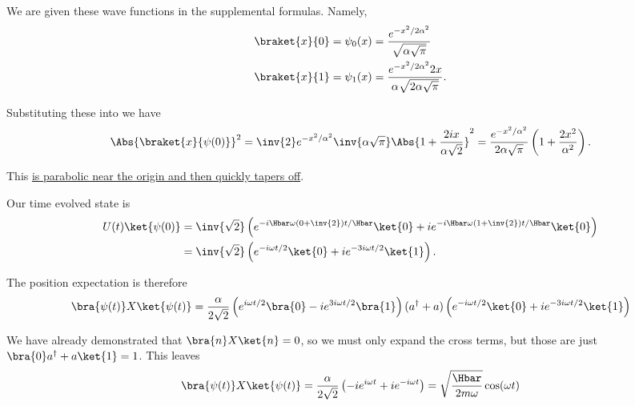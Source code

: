 {We are given these wave functions in the supplemental formulas.  Namely,
%
\begin{equation}\label{eqn:qmIexamPractice2008Dec:3:220}
\begin{aligned}
\braket{x}{0} &= \psi_0(x) = \frac{e^{-x^2/2\alpha^2}}{ \sqrt{\alpha \sqrt{\pi}}} \\
\braket{x}{1} &= \psi_1(x) = \frac{e^{-x^2/2\alpha^2} 2 x }{ \alpha \sqrt{2 \alpha \sqrt{\pi}}}.
\end{aligned}
\end{equation}

Substituting these into  we have
%
\begin{equation}\label{eqn:qmIexamPractice2008Dec:3:230}
\Abs{ \braket{x}{\psi(0)} }^2
=
\inv{2}
e^{-x^2/\alpha^2}
\inv{
\alpha \sqrt{\pi}}
\Abs{ 1 + \frac{2 i x}{\alpha \sqrt{2} } }^2
=
\frac{e^{-x^2/\alpha^2}}{ 2
\alpha \sqrt{\pi}}
\left( 1 + \frac{2 x^2}{\alpha^2 } \right).
\end{equation}

This \href{http://www.wolframalpha.com/input/?i=graph+e^(-x^2)+(1+\%2B+2x^2)}{is parabolic near the origin and then quickly tapers off}.

Our time evolved state is
\begin{equation}\label{eqn:qmIexamPractice2008Dec:3:300}
\begin{aligned}
U(t) \ket{\psi(0)} 
&= \inv{\sqrt{2}}
\left(
e^{-i \Hbar \omega \left( 0 + \inv{2} \right) t/\Hbar } \ket{0}
+ i e^{-i \Hbar \omega \left( 1 + \inv{2} \right) t/\Hbar } \ket{0}
\right) \\
&=
\inv{\sqrt{2}}
\left(
e^{-i \omega t/2 } \ket{0}
+ i e^{- 3 i \omega t/2 } \ket{1}
\right).
\end{aligned}
\end{equation}

The position expectation is therefore
\begin{equation}\label{eqn:qmIexamPractice:750}
\begin{aligned}
\bra{\psi(t)} X \ket{\psi(t)}
&=
\frac{\alpha}{2 \sqrt{2}}
\left(
e^{i \omega t/2 } \bra{0}
- i e^{ 3 i \omega t/2 } \bra{1}
\right)
(a^\dagger + a)
\left(
e^{-i \omega t/2 } \ket{0}
+ i e^{- 3 i \omega t/2 } \ket{1}
\right) \\
\end{aligned}
\end{equation}

We have already demonstrated that \(\bra{n} X \ket{n} = 0\), so we must only expand the cross terms, but those are just \(\bra{0} a^\dagger + a \ket{1} = 1\).  This leaves
%
\begin{equation}\label{eqn:qmIexamPractice2008Dec:3:310}
\bra{\psi(t)} X \ket{\psi(t)}
=
\frac{\alpha}{2 \sqrt{2}}
\left( -i e^{i \omega t} + i e^{-i \omega t} \right)
=
\sqrt{\frac{\Hbar}{2 m \omega}} \cos(\omega t)
\end{equation}

}
